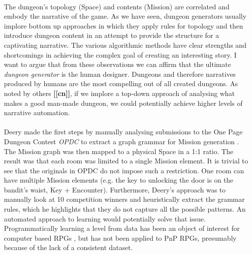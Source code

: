 \documentclass{UoYCSproject}
\begin{document}
\paragraph{}
The dungeon’s topology (Space) and contents (Mission) are correlated and embody the narrative of the game. As we have seen, dungeon generators usually implore bottom up approaches in which they apply rules for topology and then introduce dungeon content in an attempt to provide the structure for a captivating narrative. The various algorithmic methods have clear strengths and shortcomings in achieving the complex goal of creating an interesting story. I want to argue that from these observations we can affirm that the ultimate \textit{dungeon generator} is the human designer. Dungeons and therefore narratives produced by humans are the most compelling out of all created dungeons. As noted by others \textbf{[[cn]]}, if we implore a top-down approach of analysing what makes a good man-made dungeon, we could potentially achieve higher levels of narrative automation.
\paragraph{}
Deery made the first steps by manually analysing submissions to the One Page Dungeon Contest \textit{OPDC} \parencite{OPDC} to extract a graph grammar for Mission generation \parencite{Deery}. The Mission graph was then mapped to a physical Space in a 1:1 ratio. The result was that each room was limited to a single Mission element. It is trivial to see that the originals in OPDC do not impose such a restriction. One room can have multiple Mission elements (e.g. the key to unlocking the door is on the bandit’s waist, Key + Encounter). Furthermore, Deery’s approach was to manually look at 10 competition winners and heuristically extract the grammar rules, which he highlights that they do not capture all the possible patterns. An automated approach to learning would potentially solve that issue. Programmatically learning a level from data has been an object of interest for computer based RPGs \parencite{SummervilleLearningOfZelda}, but has not been applied to PnP RPGs, presumably because of the lack of a consistent dataset.
\end{document}
